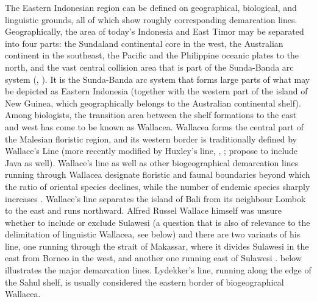 The Eastern Indonesian region can be defined on geographical, biological, and linguistic grounds, all of which show roughly corresponding demarcation lines. Geographically, the area of today's Indonesia and East Timor may be separated into four parts: the Sundaland continental core in the west, the Australian continent in the southeast, the Pacific and the Philippine oceanic plates to the north, and the vast central collision area that is part of the Sunda-Banda arc system (\citealt{Bellwood2007}, \citealt{Hall2009}). It is the Sunda-Banda arc system that forms large parts of what may be depicted as Eastern Indonesia (together with the western part of the island of New Guinea, which geographically belongs to the Australian continental shelf). Among biologists, the transition area between the shelf formations to the east and west has come to be known as Wallacea. Wallacea forms the central part of the Malesian floristic region, and its western border is traditionally defined by Wallace's Line (more recently modified by Huxley's line, \citealt{Bellwood2007}, \citealt{Raes2009}; \citealt{Welzen2011} propose to include Java as well). Wallace's line as well as other biogeographical demarcation lines running through Wallacea designate floristic and faunal boundaries beyond which the ratio of oriental species declines, while the number of endemic species sharply increases \citep{Bellwood2007}. Wallace's line separates the island of Bali from its neighbour Lombok to the east and runs northward. Alfred Russel Wallace himself was unsure whether to include or exclude Sulawesi (a question that is also of relevance to the delimitation of linguistic Wallacea, see below) and there are two variants of his line, one running through the strait of Makassar, where it divides Sulawesi in the east from Borneo in the west, and another one running east of Sulawesi \citep{Welzen2011}.  below illustrates the major demarcation lines. Lydekker's line, running along the edge of the Sahul shelf, is usually considered the eastern border of biogeographical Wallacea.

